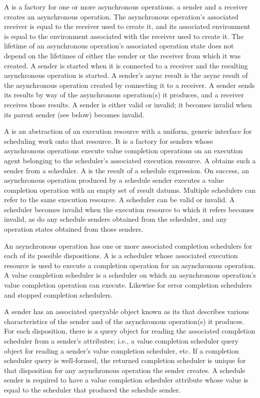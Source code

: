 \pnum
A  is a factory for one or more asynchronous operations.
 a sender and a receiver creates
an asynchronous operation.
The asynchronous operation's associated receiver is equal to
the receiver used to create it, and
its associated environment is equal to
the environment associated with the receiver used to create it.
The lifetime of an asynchronous operation's associated operation state
does not depend on the lifetimes of either the sender or the receiver
from which it was created.
A sender is started when it is connected to a receiver and
the resulting asynchronous operation is started.
A sender's async result is the async result of the asynchronous operation
created by connecting it to a receiver.
A sender sends its results by way of the asynchronous operation(s) it produces,
and a receiver receives those results.
A sender is either valid or invalid;
it becomes invalid when its parent sender (see below) becomes invalid.

\pnum
A  is an abstraction of an execution resource
with a uniform, generic interface for scheduling work onto that resource.
It is a factory for senders
whose asynchronous operations execute value completion operations
on an execution agent belonging to
the scheduler's associated execution resource.
A  obtains such a sender from a scheduler.
A  is the result of a schedule expression.
On success, an asynchronous operation produced by a schedule sender executes
a value completion operation with an empty set of result datums.
Multiple schedulers can refer to the same execution resource.
A scheduler can be valid or invalid.
A scheduler becomes invalid when the execution resource to which it refers
becomes invalid,
as do any schedule senders obtained from the scheduler, and
any operation states obtained from those senders.

\pnum
An asynchronous operation has one or more associated completion schedulers
for each of its possible dispositions.
A  is a scheduler
whose associated execution resource is used to execute
a completion operation for an asynchronous operation.
A value completion scheduler is a scheduler
on which an asynchronous operation's value completion operation can execute.
Likewise for error completion schedulers and stopped completion schedulers.

\pnum
A sender has an associated queryable object
known as its 
that describes various characteristics of the sender and
of the asynchronous operation(s) it produces.
For each disposition,
there is a query object for reading the associated completion scheduler
from a sender's attributes;
i.e., a value completion scheduler query object
for reading a sender's value completion scheduler, etc.
If a completion scheduler query is well-formed,
the returned completion scheduler is unique
for that disposition for any asynchronous operation the sender creates.
A schedule sender is required to have a value completion scheduler attribute
whose value is equal to the scheduler that produced the schedule sender.

